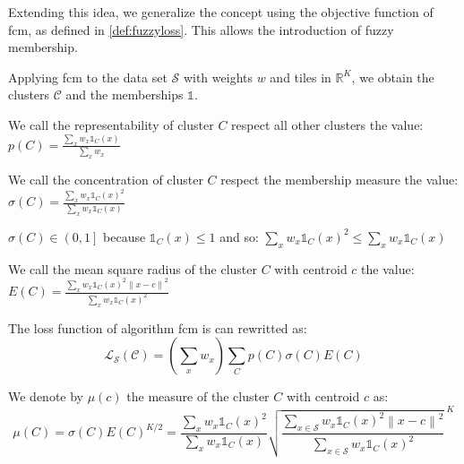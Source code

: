 \begin{modified}
\bigskip\noindent Extending this idea, we generalize the concept using the objective function of \gls{fcm}, as defined in \cref{def:fuzzyloss}. This allows the introduction of fuzzy membership.
\newpage
\begin{definition}
\label{def:cluster_values}
	Applying \gls{fcm} to the data set $\mathcal{S}$ with weights $w$ and tiles in $\mathbb{R}^K$, we obtain the clusters $\mathcal{C}$ and the memberships $\mathds{1}$.

	\noindent We call the representability of cluster $C$ respect all other clusters the value: \\$p(C) = \frac{\sum_x w_x\mathds{1}_C(x)}{\sum_x w_x}$

	\noindent We call the concentration of cluster $C$ respect the membership measure the value: $\sigma(C) = \frac{\sum_x w_x\mathds{1}_C(x)^2}{\sum_x w_x\mathds{1}_C(x)}$
	\begin{remark}
		$\sigma(C)\in\left(0,1\right]$ because $\mathds{1}_C(x)\leq1$ and so: $\sum_x w_x\mathds{1}_C(x)^2 \leq \sum_x w_x\mathds{1}_C(x)$
	\end{remark}

	\noindent We call the mean square radius of the cluster $C$ with centroid $c$ the value: \\$E(C) = \frac{\sum_x w_x\mathds{1}_C(x)^2\left\|x-c\right\|^2}{\sum_x w_x\mathds{1}_C(x)^2}$

	\noindent The loss function of algorithm \gls{fcm} is can rewritted as:
	\[
		\mathcal{L}_\mathcal{S}(\mathcal{C}) = \left(\sum_x w_x\right)\sum_C p(C)\sigma(C)E(C)
	\]

	\noindent We denote by $\mu(c)$ the measure of the cluster $C$ with centroid $c$ as:
	\begin{equation}
		\label{def:cluster_measure}
		\mu(C) = \sigma(C)E(C)^{K/2} = \frac{\sum_x w_x\mathds{1}_C(x)^2}{\sum_x w_x\mathds{1}_C(x)}{\sqrt{\frac{\sum_{x\in\mathcal{S}} w_x\mathds{1}_C(x)^2 \left\|x-c\right\|^2}{\sum_{x\in\mathcal{S}}w_x\mathds{1}_C(x)^2}}\,}^K
	\end{equation}
\end{definition}
\end{modified}

